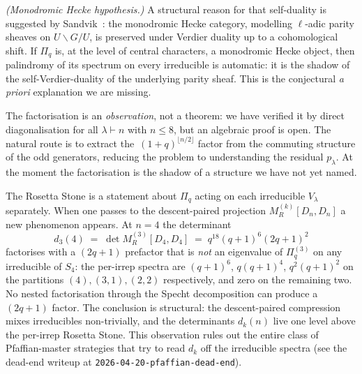 \begin{remark}
\begin{enumerate}[label=(\roman*)]
  \emph{(Monodromic Hecke hypothesis.)} A structural reason for that
  self-duality is suggested by Sandvik~\cite{sandvik-2026}: the
  monodromic Hecke category, modelling $\ell$-adic parity sheaves
  on $U \backslash G / U$, is preserved under Verdier duality up to
  a cohomological shift.  If $\Pi_q$ is, at the level of central
  characters, a monodromic Hecke object, then palindromy of its
  spectrum on every irreducible is automatic: it is the shadow of
  the self-Verdier-duality of the underlying parity sheaf.  This is
  the conjectural \emph{a priori} explanation we are missing.
\end{enumerate}
The factorisation is an \emph{observation}, not a theorem: we have
verified it by direct diagonalisation for all $\lambda \vdash n$
with $n \leq 8$, but an algebraic proof is open.  The natural route
is to extract the~$(1+q)^{\lfloor n/2 \rfloor}$ factor from the
commuting structure of the odd generators, reducing the problem to
understanding the residual $p_\lambda$.  At the moment the
factorisation is the shadow of a structure we have not yet named.
\end{remark}

\begin{remark}
\label{rem:cross-irrep-mixing}
The Rosetta Stone is a statement about $\Pi_q$ acting on each
irreducible $V_\lambda$ separately.  When one passes to the
descent-paired projection $M_R^{(k)}[D_n, D_n]$ a new phenomenon
appears.  At $n = 4$ the determinant
\[
  d_3(4) \;=\; \det M_R^{(3)}[D_4, D_4]
            \;=\; q^{18}(q+1)^6 (2q+1)^2
\]
factorises with a $(2q+1)$ prefactor that is \emph{not} an
eigenvalue of $\Pi_q^{(3)}$ on any irreducible of $S_4$: the per-irrep
spectra are $(q+1)^6$, $q(q+1)^4$, $q^2(q+1)^2$ on the partitions
$(4), (3,1), (2,2)$ respectively, and zero on the remaining two.  No
nested factorisation through the Specht decomposition can produce a
$(2q+1)$ factor.  The conclusion is structural: the descent-paired
compression mixes irreducibles non-trivially, and the determinants
$d_k(n)$ live one level above the per-irrep Rosetta Stone.  This
observation rules out the entire class of Pfaffian-master strategies
that try to read $d_k$ off the irreducible spectra (see the dead-end
writeup at \texttt{2026-04-20-pfaffian-dead-end}).
\end{remark}

